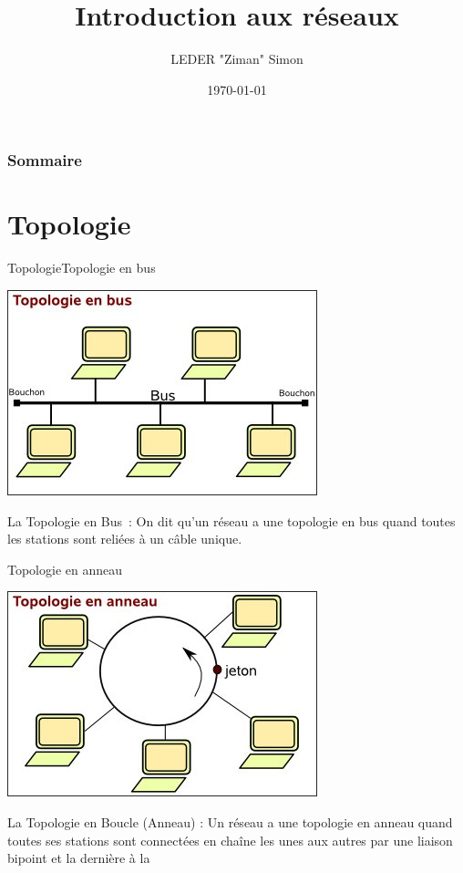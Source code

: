 \documentclass{beamer}
\title{Introduction aux réseaux}
\author{LEDER "Ziman" Simon}
\institute{Rezoleo\\}
\date{\today}
\begin{document}
	
	\maketitle

	\begin{frame}
		\frametitle{Sommaire} 
		\tableofcontents
	\end{frame}

\section{Topologie}
	\begin{frame}{Topologie}{Topologie en bus}
		\begin{center}
			\includegraphics[scale = 0.5]{Bus.jpg}\\
		\end{center}
		La Topologie en Bus : On dit qu’un réseau a une topologie en bus quand toutes les stations sont reliées à un câble unique.
	\end{frame}

	\begin{frame}{Topologie en anneau}
		\begin{center}
			\includegraphics[scale = 0.5]{Anneau.jpg}\\
		\end{center}
			La Topologie en Boucle (Anneau) : Un réseau a une topologie en anneau quand toutes ses stations sont connectées en chaîne les unes aux autres par une liaison bipoint et la dernière à la
	\end{frame}
\end{document}
